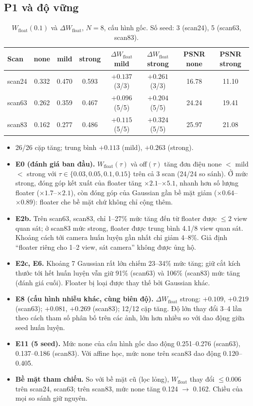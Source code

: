 \documentclass[11pt,a4paper]{article}
\newcommand{\W}{W_{\text{float}}}
\newcommand{\dW}{\Delta W_{\text{float}}}
\begin{document}
\subsection{P1 và độ vững}
\label{sec:p1}
\begin{table}[H]
\centering\small
\caption{$\W(0.1)$ và $\dW$, $N=8$, cấu hình gốc. Số seed: 3 (scan24), 5 (scan63, scan83).}
\begin{tabular}{@{}lccccccc@{}}
\toprule
Scan & none & mild & strong & $\dW$ mild & $\dW$ strong & PSNR none & PSNR strong \\
\midrule
scan24 & 0.332 & 0.470 & 0.593 & $+0.137$ (3/3) & $+0.261$ (3/3) & 16.78 & 11.10 \\
scan63 & 0.262 & 0.359 & 0.467 & $+0.096$ (5/5) & $+0.204$ (5/5) & 24.24 & 19.41 \\
scan83 & 0.162 & 0.277 & 0.486 & $+0.115$ (5/5) & $+0.324$ (5/5) & 25.97 & 21.08 \\
\bottomrule
\end{tabular}
\end{table}
\begin{itemize}
  \item 26/26 cặp tăng; trung bình $+0.113$ (mild), $+0.263$ (strong).
  \item \textbf{E0 (đánh giá ban đầu).} $\W(\tau)$ và off$(\tau)$ tăng đơn điệu none $<$ mild $<$ strong với $\tau\in\{0.03,0.05,0.1,0.15\}$ trên cả 3 scan (24/24 so sánh). Ở mức strong, đóng góp kết xuất của floater tăng $\times2.1$--$\times5.1$, nhanh hơn số lượng floater ($\times1.7$--$\times2.1$), còn đóng góp của Gaussian gần bề mặt giảm ($\times0.64$--$\times0.89$): floater che bề mặt chứ không chỉ cộng thêm.
  \item \textbf{E2b.} Trên scan63, scan83, chỉ 1--27\% mức tăng đến từ floater được $\le2$ view quan sát; ở scan83 mức strong, floater được trung bình 4.1/8 view quan sát. Khoảng cách tới camera huấn luyện gần nhất chỉ giảm 4--8\%. Giả định ``floater riêng cho 1--2 view, sát camera'' không được ủng hộ.
  \item \textbf{E2c, E6.} Khoảng 7 Gaussian rất lớn chiếm 23--34\% mức tăng; giữ cắt kích thước tới hết huấn luyện vẫn giữ 91\% (scan63) và 106\% (scan83) mức tăng (đánh giá cuối). Floater bị loại được thay thế bởi Gaussian khác.
  \item \textbf{E8 (cấu hình nhiễu khác, cùng biên độ).} $\dW$ strong: $+0.109$, $+0.219$ (scan63); $+0.081$, $+0.269$ (scan83); 12/12 cặp tăng. Độ lớn thay đổi 3--4 lần theo cách tham số phân bố trên các ảnh, lớn hơn nhiều so với dao động giữa seed huấn luyện.
  \item \textbf{E11 (5 seed).} Mức none của cấu hình gốc dao động 0.251--0.276 (scan63), 0.137--0.186 (scan83). Với affine học, mức none trên scan83 dao động 0.120--0.405.
  \item \textbf{Bề mặt tham chiếu.} So với bề mặt cũ (lọc lỏng), $\W$ thay đổi $\le0.006$ trên scan24, scan63; trên scan83, mức none tăng 0.124 $\to$ 0.162. Chiều của mọi so sánh giữ nguyên.
\end{itemize}
\end{document}
